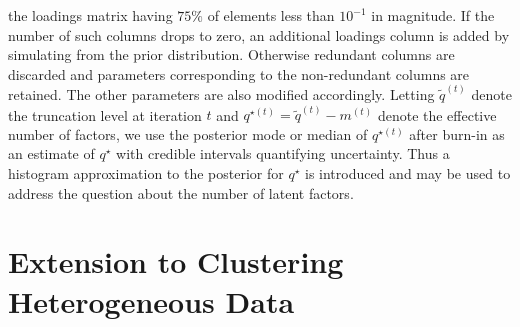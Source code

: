 \documentclass[a4paper,12pt,fleqn]{article}
\numberwithin{equation}{section}
\begin{document}
the loadings matrix having $75\%$ of elements less than $10^{-1}$ in magnitude. If the number of such columns drops to zero, an additional loadings column is added by simulating from the prior distribution. Otherwise redundant columns are discarded and parameters corresponding to the non-redundant columns are retained. The other parameters are also modified accordingly. Letting $\tilde{q}^{\left(t\right)}$ denote the truncation level at iteration $t$ and $q^{\star\left(t\right)} = \tilde{q}^{\left(t\right)} - m^{\left(t\right)}$ denote the effective number of factors, we use the posterior mode or median of $q^{\star\left(t\right)}$ after burn-in as an estimate of $q^\star$ with credible intervals quantifying uncertainty. Thus a histogram approximation to the posterior for $q^\star$ is introduced and may be used to address the question about the number of latent factors.

\section[Extension to Clustering Heterogeneous Data]{Extension to Clustering Heterogeneous Data}
\end{document}
